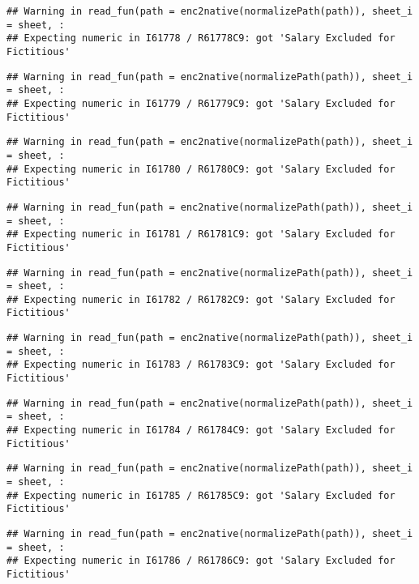 \documentclass[
]{article}
\begin{document}
\begin{verbatim}
## Warning in read_fun(path = enc2native(normalizePath(path)), sheet_i = sheet, :
## Expecting numeric in I61778 / R61778C9: got 'Salary Excluded for Fictitious'
\end{verbatim}

\begin{verbatim}
## Warning in read_fun(path = enc2native(normalizePath(path)), sheet_i = sheet, :
## Expecting numeric in I61779 / R61779C9: got 'Salary Excluded for Fictitious'
\end{verbatim}

\begin{verbatim}
## Warning in read_fun(path = enc2native(normalizePath(path)), sheet_i = sheet, :
## Expecting numeric in I61780 / R61780C9: got 'Salary Excluded for Fictitious'
\end{verbatim}

\begin{verbatim}
## Warning in read_fun(path = enc2native(normalizePath(path)), sheet_i = sheet, :
## Expecting numeric in I61781 / R61781C9: got 'Salary Excluded for Fictitious'
\end{verbatim}

\begin{verbatim}
## Warning in read_fun(path = enc2native(normalizePath(path)), sheet_i = sheet, :
## Expecting numeric in I61782 / R61782C9: got 'Salary Excluded for Fictitious'
\end{verbatim}

\begin{verbatim}
## Warning in read_fun(path = enc2native(normalizePath(path)), sheet_i = sheet, :
## Expecting numeric in I61783 / R61783C9: got 'Salary Excluded for Fictitious'
\end{verbatim}

\begin{verbatim}
## Warning in read_fun(path = enc2native(normalizePath(path)), sheet_i = sheet, :
## Expecting numeric in I61784 / R61784C9: got 'Salary Excluded for Fictitious'
\end{verbatim}

\begin{verbatim}
## Warning in read_fun(path = enc2native(normalizePath(path)), sheet_i = sheet, :
## Expecting numeric in I61785 / R61785C9: got 'Salary Excluded for Fictitious'
\end{verbatim}

\begin{verbatim}
## Warning in read_fun(path = enc2native(normalizePath(path)), sheet_i = sheet, :
## Expecting numeric in I61786 / R61786C9: got 'Salary Excluded for Fictitious'
\end{verbatim}
\end{document}
